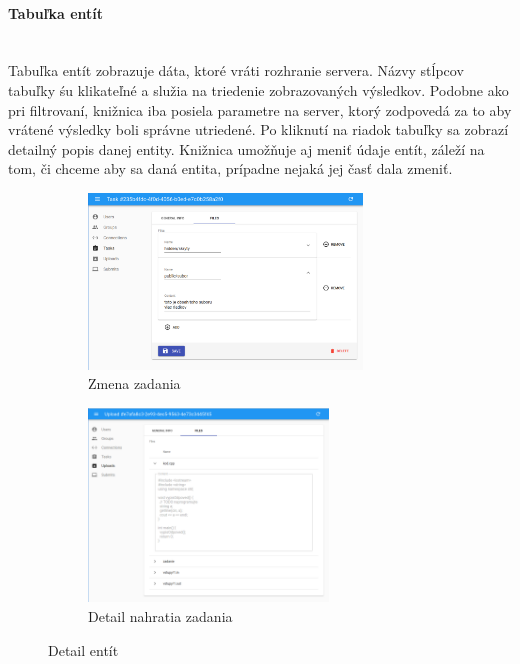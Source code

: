 \paragraph{Tabuľka entít}\leavevmode\\
Tabuľka entít zobrazuje dáta, ktoré vráti rozhranie servera. Názvy stĺpcov tabuľky śu klikateľné a
služia na triedenie zobrazovaných výsledkov. Podobne ako pri filtrovaní, knižnica iba posiela 
parametre na server, ktorý zodpovedá za to aby vrátené výsledky boli správne utriedené.
Po kliknutí na riadok tabuľky sa zobrazí detailný popis danej entity. Knižnica umožňuje aj meniť 
údaje entít, záleží na tom, či chceme aby sa daná entita, prípadne nejaká jej časť dala zmeniť.
\begin{figure}[H]
\centering
\begin{subfigure}{.5\textwidth}
  \centering
  \includegraphics[width=0.8\textwidth]{images/zmena_zadania}
  \caption[Zmena zadania]{Zmena zadania}
  \label{obr:zmena_zadania}
\end{subfigure}%
\begin{subfigure}{.5\textwidth}
  \centering
  \includegraphics[width=0.7\textwidth]{images/detail_nahratia}
  \caption[Detail nahratia zadania]{Detail nahratia zadania}
  \label{obr:detail_nahratia}
\end{subfigure}
\caption{Detail entít}
\end{figure}


